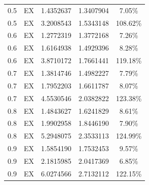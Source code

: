 \documentclass[12pt,a4paper,italian]{article}
\begin{document}
\begin{table}[ht!]
\begin{minipage}[b]{0.48\linewidth}
\begin{tabular}{c c c c c}
			  0.5 & EX & 1.4352637 &   1.3407904    &  7.05\%  \\
			  0.5 & EX & 3.2008543 &   1.5343148    & 108.62\% \\ \hline \hline
			  0.6 & EX & 1.2772319 &   1.3772168    &  7.26\%  \\
			  0.6 & EX & 1.6164938 &   1.4929396    &  8.28\%  \\
			  0.6 & EX & 3.8710172 &   1.7661441    & 119.18\% \\ \hline \hline
			  0.7 & EX & 1.3814746 &   1.4982227    &  7.79\%  \\
			  0.7 & EX & 1.7952203 &   1.6611787    &  8.07\%  \\
			  0.7 & EX & 4.5530546 &   2.0382822    & 123.38\% \\ \hline \hline
			  0.8 & EX & 1.4843627 &   1.6241829    &  8.61\%  \\
			  0.8 & EX & 1.9902958 &   1.8446190    &  7.90\%  \\
			  0.8 & EX & 5.2948075 &   2.3533113    & 124.99\% \\ \hline \hline
			  0.9 & EX & 1.5854190 &   1.7532453    &  9.57\%  \\
			  0.9 & EX & 2.1815985 &   2.0417369    &  6.85\%  \\
			  0.9 & EX & 6.0274566 &   2.7132112    & 122.15\% \\\hline
			  
		\end{tabular}
		
	\end{minipage}
\end{table}
\ \ \
\end{document}
